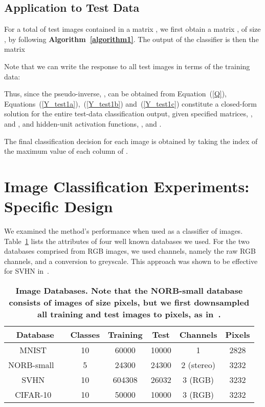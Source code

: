 \documentclass[conference]{IEEEtran}
\begin{document}
\subsection{Application to Test Data}

For a total of  test images contained in a matrix , we first obtain a matrix  , of size , by following {\bf Algorithm~\ref{algorithm1}}. The output of the classifier is then the  matrix

Note that we can write the response to all test images in terms of the training data:

Thus, since the pseudo-inverse, , can be obtained from Equation~(\ref{Q}), Equations~(\ref{Y_test1a}),~(\ref{Y_test1b}) and~(\ref{Y_test1c}) constitute a closed-form solution for the entire test-data classification output, given specified matrices, ,  and , and hidden-unit activation functions, , and .

The final classification decision for each image is obtained by taking the index of the maximum value of each column of .



\section{Image Classification Experiments: Specific Design}\label{S:3}

We  examined the method's performance  when used as a classifier of images. Table~\ref{Table1} lists the attributes of  four well known databases we used. For the two databases comprised from RGB images, we used  channels, namely the  raw RGB channels, and a conversion to greyscale. This approach was shown to be effective for SVHN in~\cite{Sermanet}. 

\begin{table}[!ht]
{\footnotesize
\begin{tabular}{|c|c|c|c|c|c|}
\hline
Database & Classes & Training & Test  & Channels & Pixels\\
\hline
MNIST~\cite{MNIST} & 10 & 60000 & 10000 & 1 & 2828\\
NORB-small~\cite{LeCun.04}\ & 5 & 24300 & 24300 & 2 (stereo) & 3232\\
SVHN~\cite{SVHN}  & 10 & 604308 & 26032 &  3 (RGB) & 3232\\
CIFAR-10~\cite{Krizhevsky} & 10 & 50000 & 10000 & 3 (RGB) & 3232\\
\hline
\end{tabular}
~\\
\caption{\bf{Image Databases. Note that the NORB-small database consists of images of size  pixels, but we first downsampled all training and test images to  pixels, as in~\cite{Le.10}.}}\label{Table1}
}
\end{table}
\end{document}
